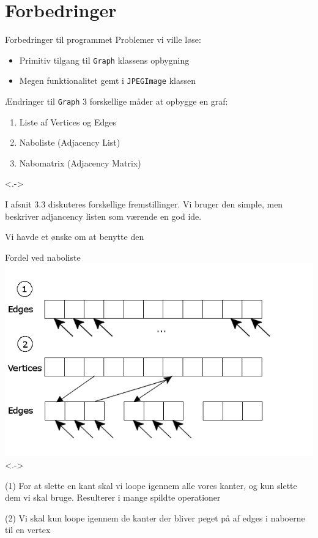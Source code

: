 \section{Forbedringer}
\begin{frame}{Forbedringer til programmet}{}
	Problemer vi ville løse:
	\begin{itemize}
		\item Primitiv tilgang til \lstinline|Graph| klassens opbygning
		\item Megen funktionalitet gemt i \lstinline|JPEGImage| klassen
	\end{itemize}
\end{frame}

\begin{frame}{Ændringer til \lstinline|Graph|}{}
	3 forskellige måder at opbygge en graf:
	\begin{enumerate}
		\item Liste af Vertices og Edges\uncover<2-2>{\textcolor{red}{$\leftarrow$}}
		\item Naboliste (Adjacency List)\uncover<3-3>{\textcolor{red}{$\leftarrow$}}
		\item Nabomatrix (Adjacency Matrix)
	\end{enumerate}
\note<.-> {
	I afsnit 3.3  diskuteres forskellige fremstillinger. Vi bruger den simple, men beskriver adjancency listen som værende en god ide.

	Vi havde et ønske om at benytte den
}
\end{frame}

\begin{frame}{Fordel ved naboliste}{}
\includegraphics[width=\textwidth]{figures/graphLists.png}
\note<.-> {
	(1)
	For at slette en kant skal vi loope igennem alle vores kanter, og kun slette dem vi skal bruge.
	Resulterer i mange spildte operationer

	(2)
	Vi skal kun loope igennem de kanter der bliver peget på af edges i naboerne til en vertex
}
\end{frame}



